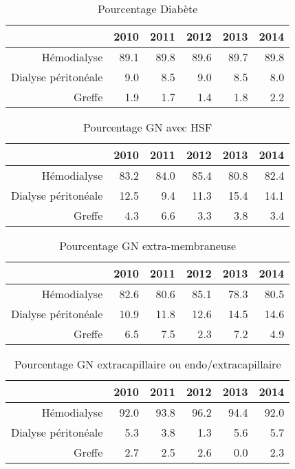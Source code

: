 \documentclass[11pt,a4paper]{article}\usepackage[]{graphicx}\usepackage[]{color}
\begin{document}
\begin{table}[H]
\centering
\begin{tabular}{rrrrrr}
  \hline
 & 2010 & 2011 & 2012 & 2013 & 2014 \\ 
  \hline
Hémodialyse & 89.1 & 89.8 & 89.6 & 89.7 & 89.8 \\ 
  Dialyse péritonéale & 9.0 & 8.5 & 9.0 & 8.5 & 8.0 \\ 
  Greffe & 1.9 & 1.7 & 1.4 & 1.8 & 2.2 \\ 
   \hline
\end{tabular}
\caption{Pourcentage Diabète} 
\end{table}
\begin{table}[H]
\centering
\begin{tabular}{rrrrrr}
  \hline
 & 2010 & 2011 & 2012 & 2013 & 2014 \\ 
  \hline
Hémodialyse & 83.2 & 84.0 & 85.4 & 80.8 & 82.4 \\ 
  Dialyse péritonéale & 12.5 & 9.4 & 11.3 & 15.4 & 14.1 \\ 
  Greffe & 4.3 & 6.6 & 3.3 & 3.8 & 3.4 \\ 
   \hline
\end{tabular}
\caption{Pourcentage GN avec HSF} 
\end{table}
\begin{table}[H]
\centering
\begin{tabular}{rrrrrr}
  \hline
 & 2010 & 2011 & 2012 & 2013 & 2014 \\ 
  \hline
Hémodialyse & 82.6 & 80.6 & 85.1 & 78.3 & 80.5 \\ 
  Dialyse péritonéale & 10.9 & 11.8 & 12.6 & 14.5 & 14.6 \\ 
  Greffe & 6.5 & 7.5 & 2.3 & 7.2 & 4.9 \\ 
   \hline
\end{tabular}
\caption{Pourcentage GN extra-membraneuse} 
\end{table}
\begin{table}[H]
\centering
\begin{tabular}{rrrrrr}
  \hline
 & 2010 & 2011 & 2012 & 2013 & 2014 \\ 
  \hline
Hémodialyse & 92.0 & 93.8 & 96.2 & 94.4 & 92.0 \\ 
  Dialyse péritonéale & 5.3 & 3.8 & 1.3 & 5.6 & 5.7 \\ 
  Greffe & 2.7 & 2.5 & 2.6 & 0.0 & 2.3 \\ 
   \hline
\end{tabular}
\caption{Pourcentage GN extracapillaire ou endo/extracapillaire} 
\end{table}
\end{document}
